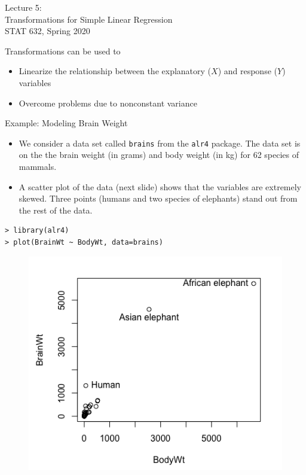 \documentclass[10pt]{beamer}
\begin{document}
\begin{frame}
\large
Lecture 5:\\ 
Transformations for Simple Linear Regression\\
STAT 632, Spring 2020
\end{frame}

\begin{frame}
Transformations can be used to
\vspace{5pt}
\begin{itemize}
\item Linearize the relationship between the explanatory ($X$) and response ($Y$) variables
\vspace{5pt}
\item Overcome problems due to nonconstant variance
\end{itemize}
\end{frame}

\begin{frame}{Example: Modeling Brain Weight}
\begin{itemize}
\item We consider a data set called \texttt{brains} from the \texttt{alr4} package.  The data set is on the the brain weight (in grams) and body weight (in kg)  for 62 species of mammals.
\vspace{5pt}
\item A scatter plot of the data (next slide) shows that the variables are extremely skewed. Three points (humans and two species of elephants) stand out from the rest of the data.
\end{itemize}
\end{frame}

\begin{frame}[fragile]
\small
\begin{verbatim}
> library(alr4) 
> plot(BrainWt ~ BodyWt, data=brains)
\end{verbatim}
\begin{figure}
\includegraphics[scale=0.4]{figure/brainplot.png}
\end{figure}
\end{frame}
\end{document}
